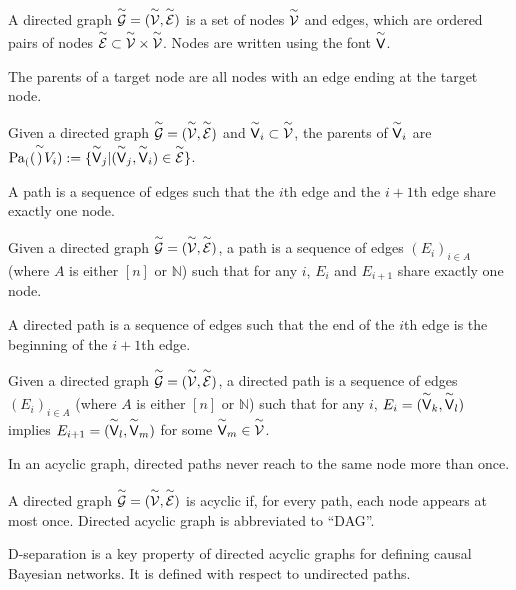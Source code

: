 \begin{definition}
A directed graph $\overset{\sim}{\mathcal{G}}=(\overset{\sim}{\mathcal{V}},\overset{\sim}{\mathcal{E}})$ is a set of nodes $\overset{\sim}{\mathcal{V}}$ and edges, which are ordered pairs of nodes $\overset{\sim}{\mathcal{E}}\subset \overset{\sim}{\mathcal{V}}\times\overset{\sim}{\mathcal{V}}$. Nodes are written using the font $\overset{\sim}{\mathsf{V}}$.
\end{definition}

The parents of a target node are all nodes with an edge ending at the target node.

\begin{definition}[Parents]
Given a directed graph $\overset{\sim}{\mathcal{G}}=(\overset{\sim}{\mathcal{V}},\overset{\sim}{\mathcal{E}})$ and $\overset{\sim}{\mathsf{V}}_i\subset \overset{\sim}{\mathcal{V}}$, the parents of $\overset{\sim}{\mathsf{V}}_i$ are $\text{Pa}_{(}(\overset{\sim}{\mathsf{)}}{V}_i):=\{\overset{\sim}{\mathsf{V}}_j|(\overset{\sim}{\mathsf{V}}_j,\overset{\sim}{\mathsf{V}}_i)\in\overset{\sim}{\mathcal{E}}\}$.
\end{definition}

A path is a sequence of edges such that the $i$th edge and the $i+1$th edge share exactly one node.

\begin{definition}[Path]
Given a directed graph $\overset{\sim}{\mathcal{G}}=(\overset{\sim}{\mathcal{V}},\overset{\sim}{\mathcal{E}})$, a path is a sequence of edges $(E_i)_{i\in A}$ (where $A$ is either $[n]$ or $\mathbb{N}$) such that for any $i$, $E_i$ and $E_{i+1}$ share exactly one node.
\end{definition}

A directed path is a sequence of edges such that the end of the $i$th edge is the beginning of the $i+1$th edge.

\begin{definition}
Given a directed graph $\overset{\sim}{\mathcal{G}}=(\overset{\sim}{\mathcal{V}},\overset{\sim}{\mathcal{E}})$, a directed path is a sequence of edges $(E_i)_{i\in A}$ (where $A$ is either $[n]$ or $\mathbb{N}$) such that for any $i$, $E_i=(\overset{\sim}{\mathsf{V}}_k,\overset{\sim}{\mathsf{V}}_l)$ implies $E_{i+1}=(\overset{\sim}{\mathsf{V}}_l,\overset{\sim}{\mathsf{V}}_m)$ for some $\overset{\sim}{\mathsf{V}}_m\in \overset{\sim}{\mathcal{V}}$.
\end{definition}

In an acyclic graph, directed paths never reach to the same node more than once.

\begin{definition}
A directed graph $\overset{\sim}{\mathcal{G}}=(\overset{\sim}{\mathcal{V}},\overset{\sim}{\mathcal{E}})$ is acyclic if, for every path, each node appears at most once. Directed acyclic graph is abbreviated to ``DAG''.
\end{definition}

D-separation is a key property of directed acyclic graphs for defining causal Bayesian networks. It is defined with respect to undirected paths.

